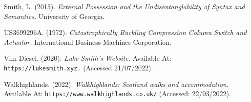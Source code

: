 \documentclass[11pt, english]{article}
\begin{document}
\begin{thebibliography}{9}
	\bibitem{}
		Smith, L. (2015).
		\textsl{External Possession and the Undisentanglability of Syntax and Semantics.}
		University of Georgia.

	\bibitem{}
		US3699296A. (1972).
		\textsl{Catastrophically Buckling Compression Column Switch and Actuator.}
		International Business Machines Corporation.

	\bibitem{}
		Vim Diesel. (2020).
		\textsl{Luke Smith's Website.}
		Available At:
		\texttt{https://lukesmith.xyz.}
		(Accessed 21/07/2022).

	\bibitem{}
		Walkhighlands. (2022).
		\textsl{Walkhighlands: Scotland walks and accommodation.}
		Available At:
		\texttt{https://www.walkhighlands.co.uk/}
		(Accessed: 22/03/2022).

	\end{thebibliography}
\end{document}
